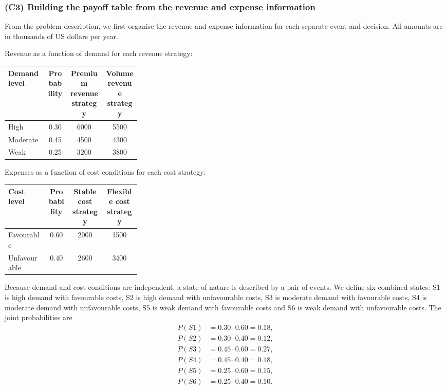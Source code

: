 \subsubsection{(C3) Building the payoff table from the revenue and expense information}\label{subsubsec:example3-c3}

From the problem description, we first organise the revenue and expense information for each separate event and decision.
All amounts are in thousands of US dollars per year.

\medskip
\noindent Revenue as a function of demand for each revenue strategy:
\begin{table}[h!]
	\centering
	\begin{tabularx}{\linewidth}{@{}L{0.3\linewidth}C C C@{}}
		\toprule
		Demand level & Probability & Premium revenue strategy & Volume revenue strategy \\
		\midrule
		High & 0.30 & 6000 & 5500 \\
		Moderate & 0.45 & 4500 & 4300 \\
		Weak & 0.25 & 3200 & 3800 \\
		\bottomrule
	\end{tabularx}
\end{table}

\medskip
\noindent Expenses as a function of cost conditions for each cost strategy:
\begin{table}[h!]
	\centering
	\begin{tabularx}{\linewidth}{@{}L{0.3\linewidth}C C C@{}}
		\toprule
		Cost level & Probability & Stable cost strategy & Flexible cost strategy \\
		\midrule
		Favourable & 0.60 & 2000 & 1500 \\
		Unfavourable & 0.40 & 2600 & 3400 \\
		\bottomrule
	\end{tabularx}
\end{table}

Because demand and cost conditions are independent, a state of nature is described by a pair of events. We define six
combined states: S1 is high demand with favourable costs, S2 is high demand with unfavourable costs, S3 is moderate demand
with favourable costs, S4 is moderate demand with unfavourable costs, S5 is weak demand with favourable costs and S6 is
weak demand with unfavourable costs. The joint probabilities are
\[
\begin{aligned}
P(S1) &= 0.30 \cdot 0.60 = 0.18,\\
P(S2) &= 0.30 \cdot 0.40 = 0.12,\\
P(S3) &= 0.45 \cdot 0.60 = 0.27,\\
P(S4) &= 0.45 \cdot 0.40 = 0.18,\\
P(S5) &= 0.25 \cdot 0.60 = 0.15,\\
P(S6) &= 0.25 \cdot 0.40 = 0.10.
\end{aligned}
\]

